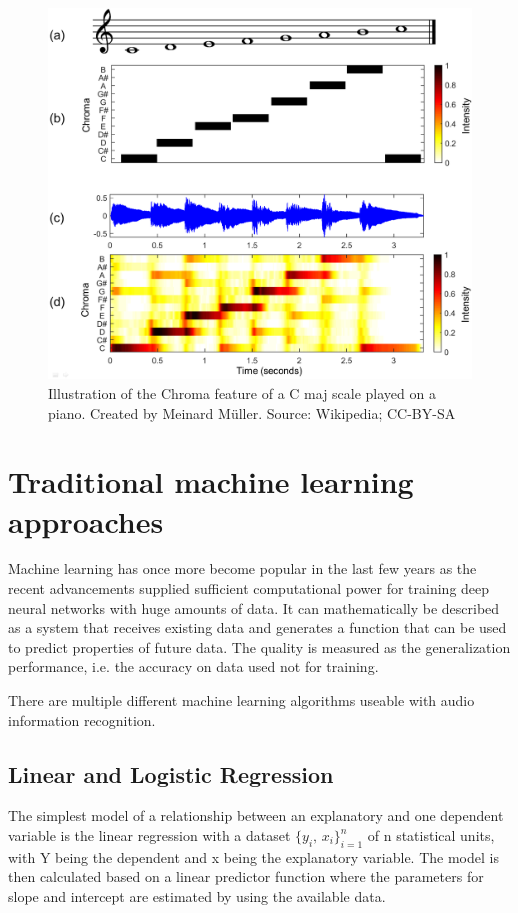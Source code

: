 \begin{figure}[H]
    \centering
	\includegraphics[width=.7\textwidth]{./images/illustrations/chroma}
    \caption{Illustration of the Chroma feature of a C maj scale played on a piano. Created by Meinard Müller. Source: Wikipedia; CC-BY-SA}
    \label{fig:chroma}
\end{figure}



\section{Traditional machine learning approaches}


Machine learning has once more become popular in the last few years as the recent advancements supplied sufficient computational power for training deep neural networks with huge amounts of data.
It can mathematically be described as a system that receives existing data and generates a function that can be used to predict properties of future data.
The quality is measured as the generalization performance, i.e. the accuracy on data used not for training.


There are multiple different machine learning algorithms useable with audio information recognition.


\subsection{Linear and Logistic Regression}
\label{chptr:reg}

 
The simplest model of a relationship between an explanatory and one dependent variable is the linear regression with a dataset ${\displaystyle \{y_{i},\,x_{i}\}_{i=1}^{n}}$ of n statistical units, with Y being the dependent and x being the explanatory variable.
The model is then calculated based on a linear predictor function where the parameters for slope and intercept are estimated by using the available data.
 
